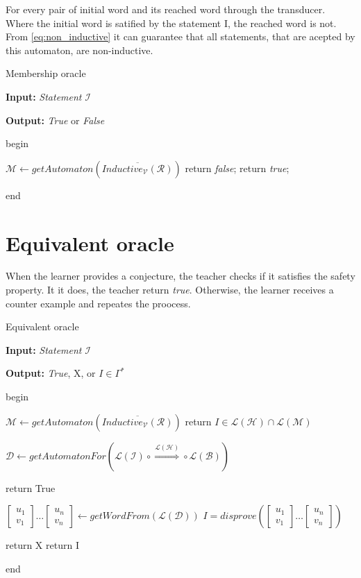 For every pair of initial word and its reached word through the transducer.
Where the initial word is satified by the statement I, the reached word is not.
From \ref{eq:non_inductive} it can guarantee that all statements, that are acepted by this automaton, are non-inductive.
\begin{algorithm}
\caption{Membership oracle}\label{alg:membership}
\textbf{Input: } \textit{Statement} $\mathcal{I}$ 

\textbf{Output: } \textit{True} or \textit{False}

begin
\begin{algorithmic}[1]
    \State $\mathcal{M} \gets getAutomaton(\overline{Inductive_{\mathcal{V}}(\mathcal{R})})$
        \State return \textit{false};
    \Else
        \State return \textit{true};
    \EndIf
\end{algorithmic}
end
\end{algorithm}
\section{Equivalent oracle}
When the learner provides a conjecture, the teacher checks if it satisfies
the safety property. It it does, the teacher return \textit{true}. Otherwise, the learner
receives a counter example and repeates the proocess.

\begin{algorithm}
    \caption{Equivalent oracle}\label{alg:equivalence}
    \textbf{Input: } \textit{Statement} $\mathcal{I}$ 

    \textbf{Output: } \textit{True}, X, or $I \in \Gamma^*$
    
    begin
    \begin{algorithmic}[1]
        \State $\mathcal{M} \gets getAutomaton(\overline{Inductive_{\mathcal{V}}(\mathcal{R})})$
         
            \State return $I \in \mathcal{L}(\mathcal{H}) \cap \mathcal{L}(\mathcal{M})$
        \EndIf

        \State $\mathcal{D} \leftarrow getAutomatonFor(\mathcal{L}(\mathcal{I}) \circ \overset{\mathcal{L}(\mathcal{H})}{\Rightarrow} \circ \mathcal{L}(\mathcal{B})) $

            \State return True
        \EndIf

        \State $[\substack{u_1 \\ v_1}] \dots [\substack{u_n \\ v_n}] \leftarrow getWordFrom(\mathcal{L}(\mathcal{D}))$
        \State $I = disprove([\substack{u_1 \\ v_1}] \dots [\substack{u_n \\ v_n}])$
        
            \State return X 
        \EndIf
        \State return I
    \end{algorithmic}
    end
\end{algorithm}

